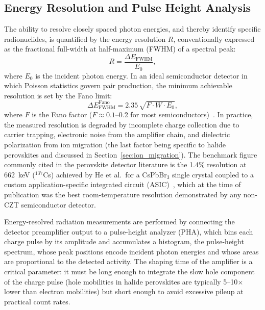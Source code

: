 \subsection{Energy Resolution and Pulse Height Analysis}

The ability to resolve closely spaced photon energies, and thereby identify
specific radionuclides, is quantified by the energy resolution $R$,
conventionally expressed as the fractional full-width at half-maximum (FWHM)
of a spectral peak:
\begin{equation}
  R = \frac{\Delta E_{\mathrm{FWHM}}}{E_0},
  \label{eq:resolution}
\end{equation}
where $E_0$ is the incident photon energy.  In an ideal semiconductor
detector in which Poisson statistics govern pair production, the minimum
achievable resolution is set by the Fano limit:
\begin{equation}
  \Delta E_{\mathrm{FWHM}}^{\mathrm{Fano}} = 2.35\,\sqrt{F \cdot W \cdot E_0},
  \label{eq:fano}
\end{equation}
where $F$ is the Fano factor ($F \approx 0.1$--0.2 for most semiconductors)~\cite{knoll2010}.
In practice, the measured resolution is degraded by incomplete charge
collection due to carrier trapping, electronic noise from the amplifier chain,
and dielectric polarization from ion migration (the last factor being
specific to halide perovskites and discussed in Section~\ref{sec:ion_migration}).
The benchmark figure commonly cited in the perovskite detector literature is
the 1.4\% resolution at 662~keV ($^{137}$Cs) achieved by He et al.\ for
a CsPbBr$_3$ single crystal coupled to a custom application-specific
integrated circuit (ASIC)~\cite{He_NatPhoton_2021}, which at the time
of publication was the best room-temperature resolution demonstrated by
any non-CZT semiconductor detector.

Energy-resolved radiation measurements are performed by connecting the
detector preamplifier output to a pulse-height analyzer (PHA), which bins
each charge pulse by its amplitude and accumulates a histogram, the
pulse-height spectrum, whose peak positions encode incident photon
energies and whose areas are proportional to the detected activity.
The shaping time of the amplifier is a critical parameter: it must be
long enough to integrate the slow hole component of the charge pulse
(hole mobilities in halide perovskites are typically 5--10$\times$ lower
than electron mobilities) but short enough to avoid excessive pileup at
practical count rates.

